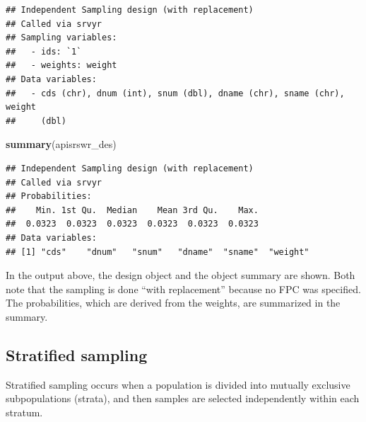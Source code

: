 \documentclass[
]{krantz}
\makeatletter
\newenvironment{Shaded}{\begin{snugshade}}{\end{snugshade}}
\newcommand{\FunctionTok}[1]{\textcolor[rgb]{0.27,0.27,0.27}{\textbf{#1}}}
\newcommand{\NormalTok}[1]{#1}
\newenvironment{kframe}{%
\medskip{}
\setlength{\fboxsep}{.8em}
 \def\at@end@of@kframe{}%
 \ifinner\ifhmode%
  \def\at@end@of@kframe{\end{minipage}}%
  \begin{minipage}{\columnwidth}%
 \fi\fi%
 \def\FrameCommand##1{\hskip\@totalleftmargin \hskip-\fboxsep
 \colorbox{shadecolor}{##1}\hskip-\fboxsep
     \hskip-\linewidth \hskip-\@totalleftmargin \hskip\columnwidth}%
 \MakeFramed {\advance\hsize-\width
   \@totalleftmargin\z@ \linewidth\hsize
   \@setminipage}}%
 {\par\unskip\endMakeFramed%
 \at@end@of@kframe}
\renewenvironment{Shaded}{\begin{kframe}}{\end{kframe}}
\makeatother
\begin{document}
\begin{verbatim}
## Independent Sampling design (with replacement)
## Called via srvyr
## Sampling variables:
##   - ids: `1` 
##   - weights: weight 
## Data variables: 
##   - cds (chr), dnum (int), snum (dbl), dname (chr), sname (chr), weight
##     (dbl)
\end{verbatim}

\begin{Shaded}
\begin{Highlighting}[]
\FunctionTok{summary}\NormalTok{(apisrswr\_des)}
\end{Highlighting}
\end{Shaded}

\begin{verbatim}
## Independent Sampling design (with replacement)
## Called via srvyr
## Probabilities:
##    Min. 1st Qu.  Median    Mean 3rd Qu.    Max. 
##  0.0323  0.0323  0.0323  0.0323  0.0323  0.0323 
## Data variables:
## [1] "cds"    "dnum"   "snum"   "dname"  "sname"  "weight"
\end{verbatim}

In the output above, the design object and the object summary are shown. Both note that the sampling is done ``with replacement'' because no FPC was specified. The probabilities, which are derived from the weights, are summarized in the summary.

\hypertarget{stratified-sampling}{%
\subsection{Stratified sampling}\label{stratified-sampling}}

Stratified sampling occurs when a population is divided into mutually exclusive subpopulations (strata), and then samples are selected independently within each stratum.
\end{document}
